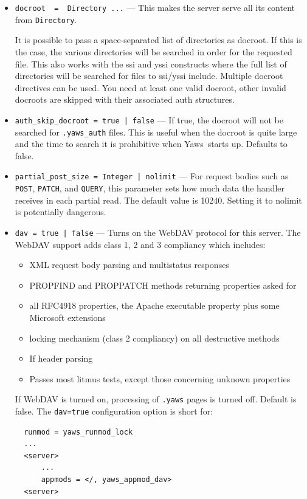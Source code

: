 \documentclass[11pt,oneside,english]{book}
\newcommand{\Yaws}            %
        {{\sc Yaws}}
\begin{document}
\begin{itemize}
\item       \verb+docroot  =  Directory ...+ ---
              This makes the server serve all its content from
              \verb+Directory+.

              It is possible to pass a space-separated list of directories as
              docroot. If this is the case, the various directories will be
              searched in order for the requested file. This also works with the
              ssi and yssi constructs where the full list of directories will be
              searched for files to ssi/yssi include. Multiple docroot
              directives can be used.  You need at least one valid docroot,
              other invalid docroots are skipped with their associated auth
              structures.

\item       \verb+auth_skip_docroot = true | false+ ---
              If true, the docroot will not be searched for
              \verb+.yaws_auth+ files. This is useful when the
              docroot is quite large and the time to search it is
              prohibitive when \Yaws\  starts up. Defaults to false.

\item       \verb+partial_post_size = Integer | nolimit+ ---
              For request bodies such as \verb+POST+, \verb+PATCH+, and
              \verb+QUERY+, this parameter sets how much data the handler
              receives in each partial read.
              The default value is 10240. Setting it to nolimit is
              potentially dangerous.

\item       \verb+dav = true | false+ ---
              Turns on the WebDAV protocol for this server. The WebDAV support adds
              class 1, 2 and 3 compliancy which includes:
              \begin{itemize}
                \item XML request body parsing and  multistatus responses
                \item PROPFIND and PROPPATCH methods returning properties asked for
                \item all RFC4918 properties, the Apache executable property plus
                      some Microsoft extensions
                \item locking mechanism (class 2 compliancy) on all destructive methods
                \item If header parsing
                \item Passes most litmus tests, except those concerning unknown
                      properties
              \end{itemize}
              If WebDAV is turned on, processing of \verb+.yaws+ pages is turned off.
              Default is false. The \verb+dav=true+ configuration option is short for:
\begin{verbatim}
  runmod = yaws_runmod_lock
  ...
  <server>
      ...
      appmods = </, yaws_appmod_dav>
  <server>
\end{verbatim}


\end{itemize}
\end{document}
